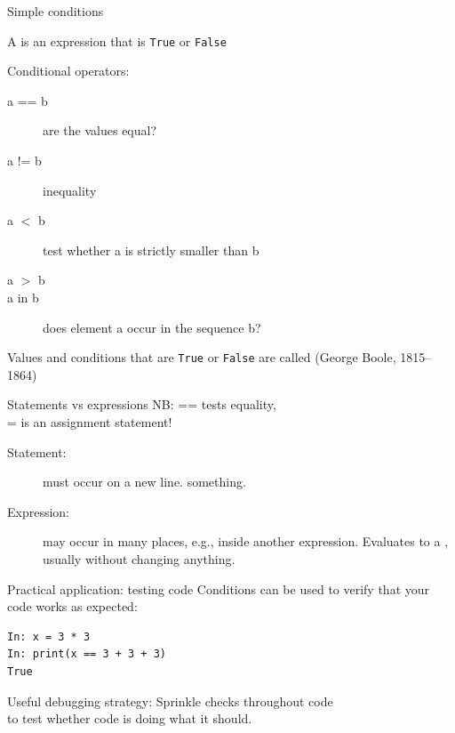 \documentclass[aspectratio=169,usenames,dvipsnames]{beamer}
\begin{document}
\begin{frame}{Simple conditions}
    \begin{definition}
        A  is
        an expression that is \texttt{True} or \texttt{False}
    \end{definition}
    Conditional operators:
    \begin{description}
        \item[a == b] are the values equal?
        \item[a != b] inequality
        \item[a $<$ b] test whether a is strictly smaller than b
        \item[a $>$ b]
        \item[a in b] does element a occur in the sequence b?
    \end{description}

    Values and conditions that are \texttt{True} or \texttt{False}
    are called  (George Boole, 1815--1864)
\end{frame}

\begin{frame}{Statements vs expressions}
    NB: == tests equality, \\
           = is an assignment statement!

    \begin{description}
        \item[Statement:] must occur on a new line.  something.
        \item[Expression:] may occur in many places, e.g., inside another expression.
            Evaluates to a , usually without changing anything.
    \end{description}
\end{frame}

\begin{frame}[fragile]{Practical application: testing code}
Conditions can be used to verify that your code works as expected:
\begin{lstlisting}
In: x = 3 * 3
In: print(x == 3 + 3 + 3)
True
\end{lstlisting}

\begin{block}{Useful debugging strategy:}
Sprinkle checks throughout code \\
to test whether code is doing what it should.
\end{block}
\end{frame}
\end{document}
